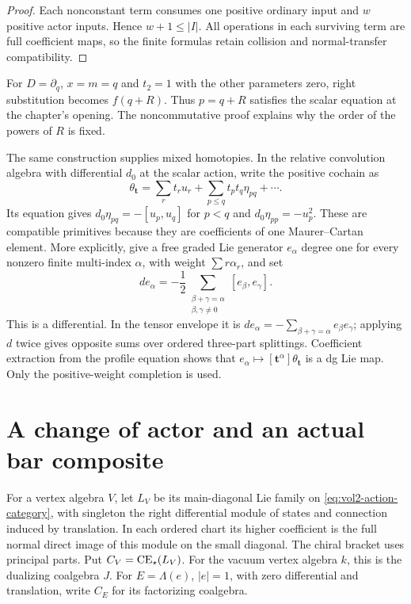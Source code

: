 \begin{proof}
Each nonconstant term consumes one positive ordinary input and $w$
positive actor inputs. Hence $w+1\leq|I|$. All operations in each
surviving term are full coefficient maps, so the finite formulas
retain collision and normal-transfer compatibility.
\end{proof}

For $D=\partial_q$, $x=m=q$ and $t_2=1$ with the other parameters
zero, right substitution becomes $f(q+R)$. Thus $p=q+R$ satisfies
the scalar equation at the chapter's opening. The noncommutative
proof explains why the order of the powers of $R$ is fixed.

The same construction supplies mixed homotopies. In the relative
convolution algebra with differential $d_0$ at the scalar action,
write the positive cochain as
\[
 \theta_{\mathbf t}=\sum_rt_ru_r+
             \sum_{p\leq q}t_pt_q\eta_{pq}+\cdots.
\]
Its equation gives $d_0\eta_{pq}=-[u_p,u_q]$ for $p<q$ and
$d_0\eta_{pp}=-u_p^2$. These are compatible primitives because they
are coefficients of one Maurer--Cartan element. More explicitly,
give a free graded Lie generator $e_\alpha$ degree one for every
nonzero finite multi-index $\alpha$, with weight $\sum r\alpha_r$,
and set
\begin{equation}\label{eq:vol2-profile-cells}
 de_\alpha=-\frac12
   \sum_{\substack{\beta+\gamma=\alpha\\\beta,\gamma\ne0}}
                  [e_\beta,e_\gamma].
\end{equation}
This is a differential. In the tensor envelope it is
$de_\alpha=-\sum_{\beta+\gamma=\alpha}e_\beta e_\gamma$;
applying $d$ twice gives opposite sums over ordered three-part
splittings. Coefficient extraction from the profile equation shows
that $e_\alpha\mapsto[\mathbf t^\alpha]\theta_{\mathbf t}$ is a
dg Lie map. Only the positive-weight completion is used.

\section{A change of actor and an actual bar composite}
\label{sec:vol2-actor-composite}

For a vertex algebra $V$, let $L_V$ be its main-diagonal Lie family
on \eqref{eq:vol2-action-category}, with singleton the right
differential module of states and connection induced by translation.
In each ordered chart its higher coefficient is the full normal
direct image of this module on the small diagonal. The chiral bracket
uses principal parts. Put $C_V=\operatorname{CE}_{\star}(L_V)$.
For the vacuum vertex algebra $k$, this is the dualizing coalgebra
$J$. For $E=\Lambda(e)$, $|e|=1$, with zero differential and
translation, write $C_E$ for its factorizing coalgebra.

